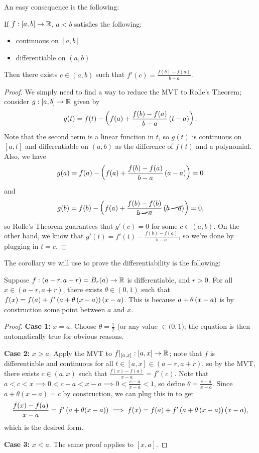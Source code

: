 \documentclass[main.tex]{subfiles}
\begin{document}
An easy consequence is the following:

\begin{theorem}
    If $f : [a, b] \to \mathbb R$, $a < b$ satisfies the following:
    \begin{itemize}
        \item continuous on $[a, b]$
        \item differentiable on $(a, b)$
    \end{itemize}
    Then there exists $c\in (a, b)$ such that $f'(c) = \frac{f(b) - f(a)}{b - a}$.
\end{theorem}

\begin{proof}
    We simply need to find a way to reduce the MVT to Rolle's Theorem; consider $g : [a, b] \to \mathbb R$ given by
    \[g(t) = f(t) - \left( f(a) + \frac{f(b) - f(a)}{b - a}\left( t - a \right) \right).\]
    Note that the second term is a linear function in $t$, so $g(t)$ is continuous on $[a, t]$ and differentiable on $(a, b)$ as the difference of $f(t)$ and a polynomial. Also, we have
    \[g(a) = f(a) - \left( f(a) + \frac{f(b) - f(a)}{b - a}\left( a - a \right) \right) = 0\]
    and
    \[g(b) = f(b) - \left( f(a) + \frac{f(b) - f(b)}{\cancel{b - a}}\left( \cancel{b - a} \right) \right) = 0,\]
    so Rolle's Theorem guarantees that $g'(c) = 0$ for some $c\in (a, b)$. On the other hand, we know that $g'(t) = f'(t) - \frac{f(b) - f(a)}{b - a}$, so we're done by plugging in $t = c$.
\end{proof}

The corollary we will use to prove the differentiability is the following:
\begin{corollary}
    Suppose $f : (a - r, a + r) = B_r(a) \to \mathbb R$ is differentiable, and $r > 0$. For all $x\in (a - r, a + r)$, there exists $\theta \in (0, 1)$ such that $f(x) = f(a) + f'\left( a + \theta\left( x - a \right) \right)(x - a)$. This is because $a + \theta\left( x - a \right)$ is by construction some point between $a$ and $x$.
\end{corollary}

\begin{proof}
    \textbf{Case 1:} $x = a$. Choose $\theta = \frac{1}{2}$ (or any value $\in (0, 1$); the equation is then automatically true for obvious reasons.

    \textbf{Case 2:} $x > a$. Apply the MVT to $f |_{[a, x]} : [a, x] \to \mathbb R$; note that $f$ is differentiable and continuous for all $t\in [a, x]\in (a - r, a + r)$, so by the MVT, there exists $c\in (a, x)$ such that $\frac{f(x) - f(a)}{x - a} = f'(c)$. Note that $a < c < x\implies 0 < c - a < x- a \implies 0 < \frac{c - a}{x - a} < 1$, so define $\theta = \frac{c - a}{x - a}$. Since $a + \theta(x - a) = c$ by construction, we can plug this in to get
    \[\frac{f(x) - f(a)}{x - a} = f'\left( a + \theta(x - a) \right)\implies f(x) = f(a) + f'\left( a + \theta\left( x - a \right) \right)(x - a),\]
    which is the desired form.

    \textbf{Case 3:} $x < a$. The same proof applies to $[x, a]$.
\end{proof}
\end{document}
